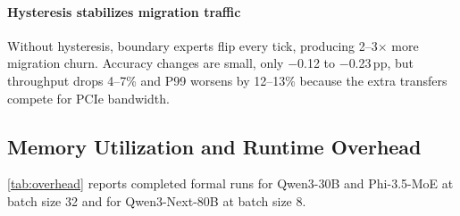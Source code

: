\paragraph{Hysteresis stabilizes migration traffic}
Without hysteresis, boundary experts flip every tick, producing 2--3$\times$ more migration churn. Accuracy changes are small, only $-$0.12 to $-$0.23\,pp, but throughput drops 4--7\% and P99 worsens by 12--13\% because the extra transfers compete for PCIe bandwidth.

\subsection{Memory Utilization and Runtime Overhead}
\label{sec:eval-overhead}

\autoref{tab:overhead} reports completed formal runs for Qwen3-30B and Phi-3.5-MoE at batch size 32 and for Qwen3-Next-80B at batch size 8.

\begin{table}[t]
\centering
\caption{Memory utilization and runtime overhead. Batch size 32 for Qwen3-30B and Phi-3.5-MoE; batch size 8 for Qwen3-Next-80B.}
\label{tab:overhead}
\vspace{-0.5em}
\setlength{\tabcolsep}{4pt}
\end{table}

